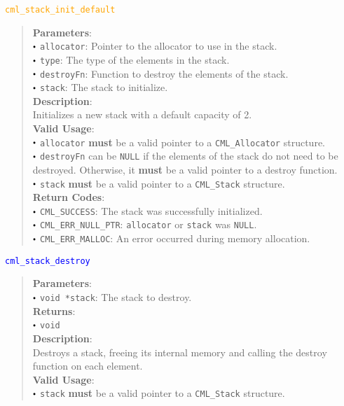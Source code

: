\documentclass[a4paper,oneside,10pt]{article}
\newcommand{\function}[1]{
  \noindent\textcolor{blue}{\texttt{#1}}
  \vspace{-0.3em}
}
\newcommand{\macro}[1]{
  \noindent\textcolor{orange}{\texttt{#1}}
  \vspace{-0.3em}
}
\renewcommand{\dot}{\raisebox{0.3ex}{\scalebox{0.6}{$\bullet$}}}
\theoremstyle{definition}
\begin{document}
\macro{cml\_stack\_init\_default}
\begin{quote}
  \textbf{Parameters}: \\
  $\dot$ \texttt{allocator}: Pointer to the allocator to use in the stack. \\
  $\dot$ \texttt{type}: The type of the elements in the stack. \\
  $\dot$ \texttt{destroyFn}: Function to destroy the elements of the stack. \\
  $\dot$ \texttt{stack}: The stack to initialize. \\
  
  \vspace{-0.75em}
  \textbf{Description}: \\
  Initializes a new stack with a default capacity of 2. \\

  \vspace{-0.75em}
  \textbf{Valid Usage}: \\
  $\dot$ \texttt{allocator} \textbf{must} be a valid pointer to a \texttt{CML\_Allocator} structure. \\
  $\dot$ \texttt{destroyFn} can be \texttt{NULL} if the elements of the stack do not need to be destroyed. Otherwise, it \textbf{must} be a valid pointer to a destroy function. \\
  $\dot$ \texttt{stack} \textbf{must} be a valid pointer to a \texttt{CML\_Stack} structure. \\

  \vspace{-0.75em}
  \textbf{Return Codes}: \\
  $\dot$ \texttt{CML\_SUCCESS}: The stack was successfully initialized. \\
  $\dot$ \texttt{CML\_ERR\_NULL\_PTR}: \texttt{allocator} or \texttt{stack} was \texttt{NULL}. \\
  $\dot$ \texttt{CML\_ERR\_MALLOC}: An error occurred during memory allocation. \\
\end{quote}

\function{cml\_stack\_destroy}
\begin{quote}
  \textbf{Parameters}: \\
  $\dot$ \texttt{void *stack}: The stack to destroy. \\
  \textbf{Returns}: \\
  $\dot$ \texttt{void} \\
  
  \vspace{-0.75em}
  \textbf{Description}: \\
  Destroys a stack, freeing its internal memory and calling the destroy function on each element. \\

  \vspace{-0.75em}
  \textbf{Valid Usage}: \\
  $\dot$ \texttt{stack} \textbf{must} be a valid pointer to a \texttt{CML\_Stack} structure. \\
\end{quote}
\end{document}

